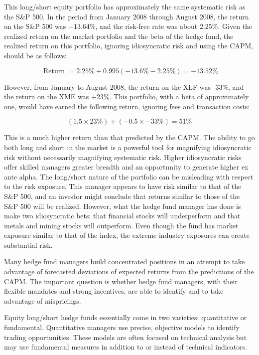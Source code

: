 \documentclass[11pt]{article}
\begin{document}
This long/short equity portfolio has approximately the same systematic risk as the S\&P 500. In the period from January 2008 through August 2008, the return on the S\&P 500 was $-13.64 \%$, and the risk-free rate was about $2.25 \%$. Given the realized return on the market portfolio and the beta of the hedge fund, the realized return on this portfolio, ignoring idiosyncratic risk and using the CAPM, should be as follows:

$$
\text { Return }=2.25 \%+0.995(-13.6 \%-2.25 \%)=-13.52 \%
$$

However, from January to August 2008, the return on the XLF was -33\%, and the return on the XME was $+23 \%$. This portfolio, with a beta of approximately one, would have earned the following return, ignoring fees and transaction costs:

$$
(1.5 \times 23 \%)+(-0.5 \times-33 \%)=51 \%
$$

This is a much higher return than that predicted by the CAPM. The ability to go both long and short in the market is a powerful tool for magnifying idiosyncratic risk without necessarily magnifying systematic risk. Higher idiosyncratic risks offer skilled managers greater breadth and an opportunity to generate higher ex ante alpha. The long/short nature of the portfolio can be misleading with respect to the risk exposure. This manager appears to have risk similar to that of the S\&P 500, and an investor might conclude that returns similar to those of the S\&P 500 will be realized. However, what the hedge fund manager has done is make two idiosyncratic bets: that financial stocks will underperform and that metals and mining stocks will outperform. Even though the fund has market exposure similar to that of the index, the extreme industry exposures can create substantial risk.

Many hedge fund managers build concentrated positions in an attempt to take advantage of forecasted deviations of expected returns from the predictions of the CAPM. The important question is whether hedge fund managers, with their flexible mandates and strong incentives, are able to identify and to take advantage of mispricings.

Equity long/short hedge funds essentially come in two varieties: quantitative or fundamental. Quantitative managers use precise, objective models to identify trading opportunities. These models are often focused on technical analysis but may use fundamental measures in addition to or instead of technical indicators.
\end{document}
